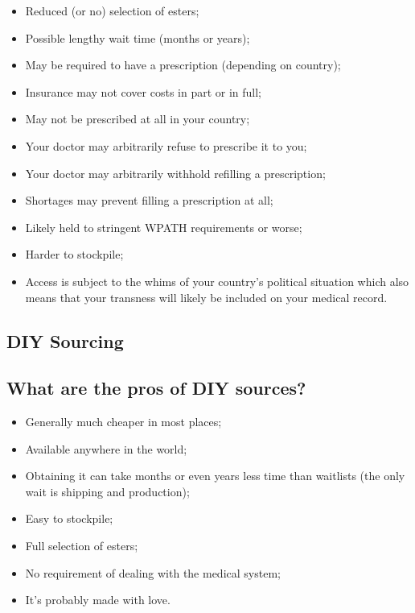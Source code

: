 \documentclass{article}
\begin{document}
{{\begin{itemize}
  \item Reduced (or no) selection of esters;
  \item Possible lengthy wait time (months or years);
  \item May be required to have a prescription (depending on country);
  \item Insurance may not cover costs in part or in full;
  \item May not be prescribed at all in your country;
  \item Your doctor may arbitrarily refuse to prescribe it to you;
  \item Your doctor may arbitrarily withhold refilling a prescription;
  \item Shortages may prevent filling a prescription at all;
  \item Likely held to stringent WPATH requirements or worse;
  \item Harder to stockpile;
  \item Access is subject to the whims of your country’s political situation which also means that your transness will likely be included on your medical record. 
\end{itemize}

\subsection*{DIY Sourcing}

\subsection{What are the pros of DIY sources?}

\begin{itemize}
\item Generally much cheaper in most places;
\item Available anywhere in the world;
\item Obtaining it can take months or even years less time than waitlists (the only wait is shipping and production);
\item Easy to stockpile;
\item Full selection of esters;
\item No requirement of dealing with the medical system;
\item It’s probably made with love.
\end{itemize}

}}
\end{document}
